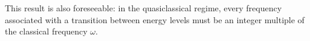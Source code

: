 This result is also foreseeable: in the quasiclassical regime, every frequency
associated with a transition between energy levels must be an integer multiple
of the classical frequency $\omega$.

